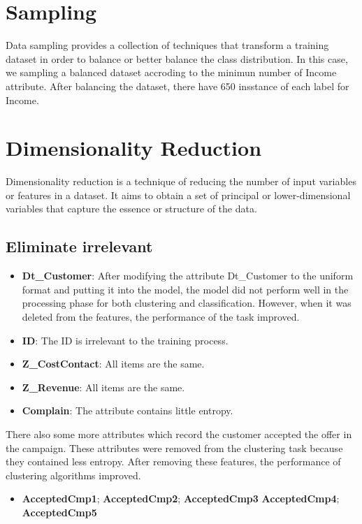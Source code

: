 \section{Sampling}
Data sampling provides a collection of techniques that transform a training dataset in order to balance or better balance the class distribution.
In this case, we sampling a balanced dataset accroding to the minimun number of Income attribute. After balancing the dataset, there have 650 insstance of each label for Income.
\section{Dimensionality Reduction}
Dimensionality reduction is a technique of reducing the number of input variables or features in a dataset. It aims to obtain a set of principal or lower-dimensional variables that capture the essence or structure of the data.
\subsection{Eliminate irrelevant}

\begin{itemize}
    \item \textbf{Dt\_Customer}: After modifying the attribute Dt\_Customer to the uniform format and putting it into the model, the model did not perform well in the processing phase for both clustering and classification. However, when it was deleted from the features, the performance of the task improved.
    \item \textbf{ID}: The ID is irrelevant to the training process.
    \item \textbf{Z\_CostContact}: All items are the same.
    \item \textbf{Z\_Revenue}: All items are the same.
    \item \textbf{Complain}: The attribute contains little entropy.
\end{itemize}

There also some more attributes which record the customer accepted the offer in the campaign. These attributes were removed from the clustering task because they contained less entropy. After removing these features, the performance of clustering algorithms improved.
\begin{itemize}
    \item \textbf{AcceptedCmp1}; \textbf{AcceptedCmp2}; \textbf{AcceptedCmp3} \textbf{AcceptedCmp4}; \textbf{AcceptedCmp5}
\end{itemize}

